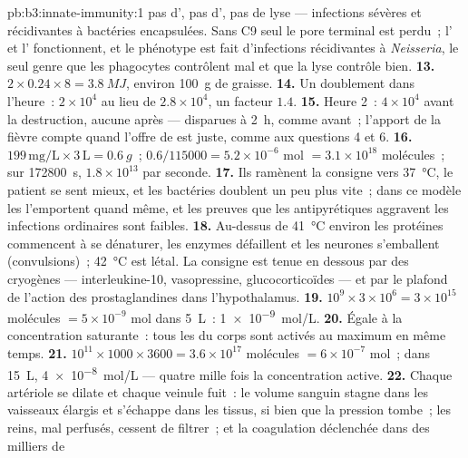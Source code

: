 \begin{solution}{pb:b3:innate-immunity:1}
pas d', pas d', pas de lyse --- infections
sévères et récidivantes à bactéries encapsulées. Sans C9 seul le pore
terminal est perdu~; l' et l' fonctionnent, et le
phénotype est fait d'infections récidivantes à \emph{Neisseria}, le seul
genre que les phagocytes contrôlent mal et que la lyse contrôle bien.
\textbf{13.} $2\times 0.24\times 8 = \qty{3.8}{MJ}$, environ \qty{100}{g}
de graisse.
\textbf{14.} Un doublement dans l'heure~: $2\times 10^{4}$ au lieu de
$2.8\times 10^{4}$, un facteur $1.4$.
\textbf{15.} Heure 2~: $4\times 10^{4}$ avant la destruction, aucune
après --- disparues à \qty{2}{h}, comme avant~; l'apport de la fièvre
compte quand l'offre de  est juste, comme aux questions 4 et 6.
\textbf{16.} $199\,\text{mg/L}\times 3\,\text{L} = \qty{0.6}{g}$~; $0.6/
\num{115000} = 5.2\times 10^{-6}$ mol $= 3.1\times 10^{18}$ molécules~;
sur \qty{172800}{s}, $1.8\times 10^{13}$ par seconde.
\textbf{17.} Ils ramènent la consigne vers \qty{37}{\celsius}, le patient
se sent mieux, et les bactéries doublent un peu plus vite~; dans ce
modèle les  l'emportent quand même, et les preuves que les
antipyrétiques aggravent les infections ordinaires sont faibles.
\textbf{18.} Au-dessus de \qty{41}{\celsius} environ les protéines
commencent à se dénaturer, les enzymes défaillent et les neurones
s'emballent (convulsions)~; \qty{42}{\celsius} est létal. La consigne est
tenue en dessous par des cryogènes --- interleukine-10, vasopressine,
glucocorticoïdes --- et par le plafond de l'action des prostaglandines
dans l'hypothalamus.
\textbf{19.} $10^{9}\times 3\times 10^{6} = 3\times 10^{15}$ molécules
$= 5\times 10^{-9}$ mol dans \qty{5}{L}~: \qty{1e-9}{mol/L}.
\textbf{20.} Égale à la concentration saturante~: tous les  du
corps sont activés au maximum en même temps.
\textbf{21.} $10^{11}\times 1000\times 3600 = 3.6\times 10^{17}$ molécules
$= 6\times 10^{-7}$ mol~; dans \qty{15}{L}, \qty{4e-8}{mol/L} --- quatre
mille fois la concentration active.
\textbf{22.} Chaque artériole se dilate et chaque veinule fuit~: le
volume sanguin stagne dans les vaisseaux élargis et s'échappe dans les
tissus, si bien que la pression tombe~; les reins, mal perfusés, cessent
de filtrer~; et la coagulation déclenchée dans des milliers de

\end{solution}
